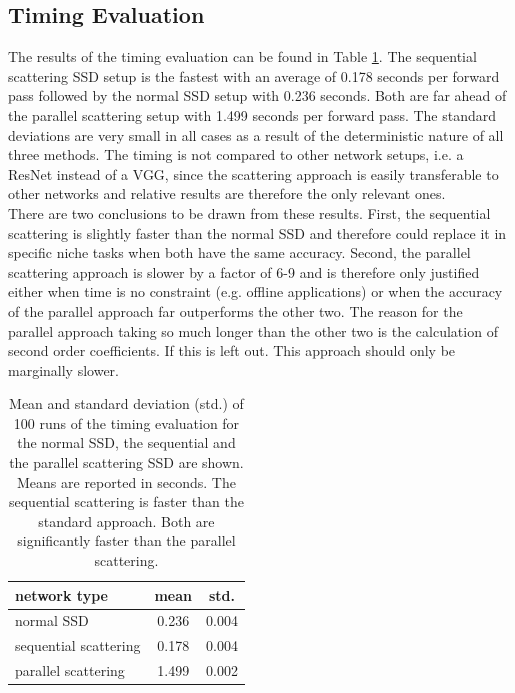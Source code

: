 \subsection{Timing Evaluation}
\label{subsec:timing_evaluation_results}

The results of the timing evaluation can be found in Table \ref{table:timing_evaluation}. The sequential scattering SSD setup is the fastest with an average of 0.178 seconds per forward pass followed by the normal SSD setup with 0.236 seconds. Both are far ahead of the parallel scattering setup with 1.499 seconds per forward pass. The standard deviations are very small in all cases as a result of the deterministic nature of all three methods. The timing is not compared to other network setups, i.e. a ResNet instead of a VGG, since the scattering approach is easily transferable to other networks and relative results are therefore the only relevant ones. \\
There are two conclusions to be drawn from these results. First, the sequential scattering is slightly faster than the normal SSD and therefore could replace it in specific niche tasks when both have the same accuracy. Second, the parallel scattering approach is slower by a factor of 6-9 and is therefore only justified either when time is no constraint (e.g. offline applications) or when the accuracy of the parallel approach far outperforms the other two. The reason for the parallel approach taking so much longer than the other two is the calculation of second order coefficients. If this is left out. This approach should only be marginally slower.

\begin{table}[!htb]
	\centering
	\caption{Mean and standard deviation (std.) of 100 runs of the timing evaluation for the normal SSD, the sequential and the parallel scattering SSD are shown. Means are reported in seconds. The sequential scattering is faster than the standard approach. Both are significantly faster than the parallel scattering.}
	\begin{tabular}{lcc}
		\toprule
		network type & mean & std. \\
		\midrule
		normal SSD & 0.236 & 0.004 \\
		sequential scattering & 0.178 & 0.004 \\
		parallel scattering & 1.499 & 0.002 \\
		\bottomrule
	\end{tabular}
	\label{table:timing_evaluation}
\end{table}

